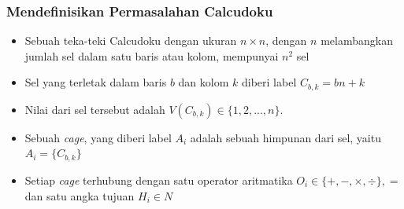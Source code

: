 \documentclass{beamer}
\begin{document}

\begin{frame}
\frametitle{Mendefinisikan Permasalahan Calcudoku}
\begin{itemize}
\item Sebuah teka-teki Calcudoku dengan ukuran \begin{math}n \times n\end{math}, dengan \begin{math}n\end{math} melambangkan jumlah sel dalam satu baris atau kolom, mempunyai \begin{math}n^2\end{math} sel
\item Sel yang terletak dalam baris \begin{math}b\end{math} dan kolom \begin{math}k\end{math} diberi label \begin{math}C_{b,k} = bn + k\end{math}
\item Nilai dari sel tersebut adalah \begin{math}V(C_{b,k}) \in \{1, 2, ..., n\}\end{math}.
\item Sebuah \textit{cage}, yang diberi label \begin{math}A_i\end{math} adalah sebuah himpunan dari sel, yaitu \begin{math}A_i = \{C_{b,k}\}\end{math}
\item Setiap \textit{cage} terhubung dengan satu operator aritmatika \begin{math}O_i \in \{+, -, \times, \div\}, =\end{math} dan satu angka tujuan \begin{math}H_i \in N\end{math}
\end{itemize}
\end{frame}
\end{document}
